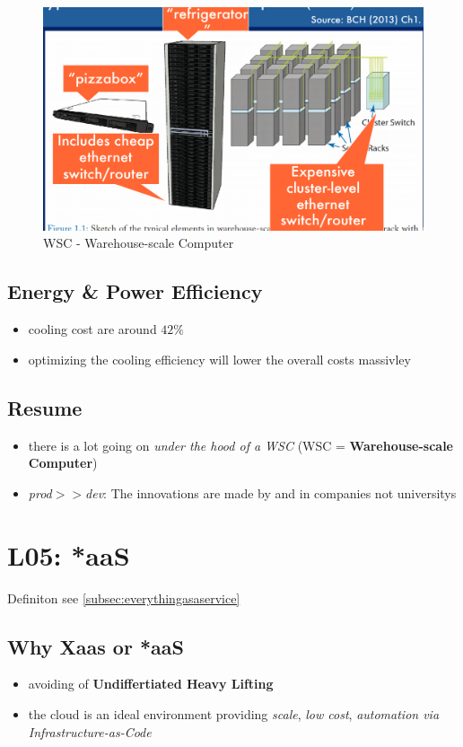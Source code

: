 \documentclass[a4paper]{article}
\begin{document}
\begin{multicols}{3}
\begin{figure}[H]
    \includegraphics[width=\linewidth]{warehousescalecomputer.png}
    \caption{WSC - Warehouse-scale Computer}
    \label{fig:warehousescalecomputer}
\end{figure}

\subsection*{Energy \& Power Efficiency}
\begin{itemize}
    \item cooling cost are around $42\%$
    \item optimizing the cooling efficiency will lower the overall costs massivley
\end{itemize}

\subsection*{Resume}
\begin{itemize}
    \item there is a lot going on \textit{under the hood of a WSC} (WSC = \textbf{Warehouse-scale Computer})
    \item \textit{prod$>>$dev}: The innovations are made by and in companies not universitys
\end{itemize}

\section*{L05: *aaS}
Definiton see \cref{subsec:everythingasaservice}

\subsection*{Why Xaas or *aaS}
\begin{itemize}
    \item avoiding of \textbf{Undiffertiated Heavy Lifting}
    \item the cloud is an ideal environment providing \textit{scale}, \textit{low cost}, \textit{automation via Infrastructure-as-Code}
\end{itemize}


\end{multicols}
\end{document}

